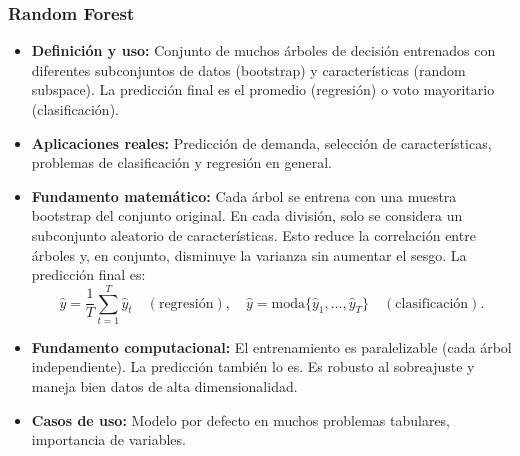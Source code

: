 \documentclass[12pt,a4paper,openany,oneside]{book}
\begin{document}
\subsubsection{Random Forest}
\begin{itemize}
    \item \textbf{Definición y uso:} Conjunto de muchos árboles de decisión entrenados con diferentes subconjuntos de datos (bootstrap) y características (random subspace). La predicción final es el promedio (regresión) o voto mayoritario (clasificación).
    \item \textbf{Aplicaciones reales:} Predicción de demanda, selección de características, problemas de clasificación y regresión en general.
    \item \textbf{Fundamento matemático:} Cada árbol se entrena con una muestra bootstrap del conjunto original. En cada división, solo se considera un subconjunto aleatorio de características. Esto reduce la correlación entre árboles y, en conjunto, disminuye la varianza sin aumentar el sesgo. La predicción final es:
    \[
    \hat{y} = \frac{1}{T} \sum_{t=1}^T \hat{y}_t \quad (\text{regresión}), \quad \hat{y} = \text{moda}\{\hat{y}_1,\dots,\hat{y}_T\} \quad (\text{clasificación}).
    \]
    \item \textbf{Fundamento computacional:} El entrenamiento es paralelizable (cada árbol independiente). La predicción también lo es. Es robusto al sobreajuste y maneja bien datos de alta dimensionalidad.
    \item \textbf{Casos de uso:} Modelo por defecto en muchos problemas tabulares, importancia de variables.
\end{itemize}
\end{document}
